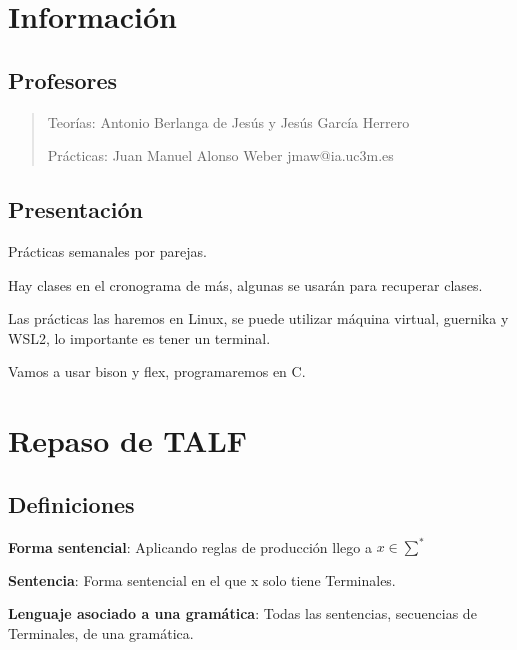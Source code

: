 \documentclass[12pt, twoside, openright]{report} %
\begin{document}
\listoffigures
\thispagestyle{fancy}

\clearpage
{} %



\chapter{Información}
\section{Profesores}

\begin{quote}
Teorías: Antonio Berlanga de Jesús y Jesús García Herrero

Prácticas: Juan Manuel Alonso Weber jmaw@ia.uc3m.es
\end{quote}

\section{Presentación}

Prácticas semanales por parejas.

Hay clases en el cronograma de más, algunas se usarán para recuperar clases.

Las prácticas las haremos en Linux, se puede utilizar máquina virtual, guernika y WSL2, lo importante es tener un terminal.

Vamos a usar bison y flex, programaremos en C.

\chapter{Repaso de TALF}

\section{Definiciones}

\textbf{Forma sentencial}: Aplicando reglas de producción llego a \(x \in \sum^*\)

\textbf{Sentencia}: Forma sentencial en el que x solo tiene Terminales.

\textbf{Lenguaje asociado a una gramática}: Todas las sentencias, secuencias de Terminales, de una gramática.
\end{document}
